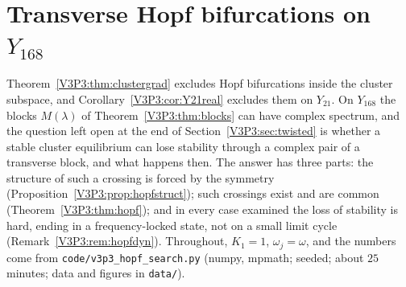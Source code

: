 \section{Transverse Hopf bifurcations on \texorpdfstring{$Y_{168}$}{Y168}}\label{V3P3:sec:hopf}

Theorem~\ref{V3P3:thm:clustergrad} excludes Hopf bifurcations inside the cluster subspace, and
Corollary~\ref{V3P3:cor:Y21real} excludes them on $Y_{21}$. On $Y_{168}$ the blocks $M(\lambda)$ of
Theorem~\ref{V3P3:thm:blocks} can have complex spectrum, and the question left open at the end of
Section~\ref{V3P3:sec:twisted} is whether a stable cluster equilibrium can lose stability through a
complex pair of a transverse block, and what happens then. The answer has three parts: the
structure of such a crossing is forced by the symmetry (Proposition~\ref{V3P3:prop:hopfstruct}); such
crossings exist and are common (Theorem~\ref{V3P3:thm:hopf}); and in every case examined the loss
of stability is hard, ending in a frequency-locked state, not on a small limit cycle
(Remark~\ref{V3P3:rem:hopfdyn}). Throughout, $K_1=1$, $\omega_j=\omega$, and the numbers come from
\texttt{code/v3p3\_hopf\_search.py} (numpy, mpmath; seeded; about $25$ minutes; data and figures in
\texttt{data/}).

